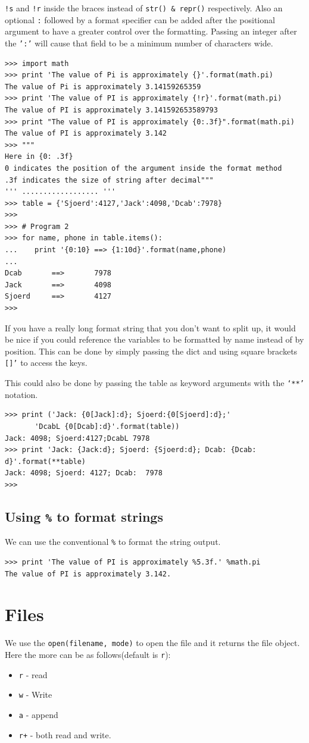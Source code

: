 \documentclass[12pt,a4paper]{article}
\begin{document}
\texttt{!s} and \texttt{!r} inside the braces instead of \texttt{str() \& repr()} respectively.  Also an optional \texttt{:} followed by a format specifier can be added after the positional argument to have a greater control over the formatting. Passing an integer after the \texttt{':'} will cause that field to be a minimum number of characters wide.

\begin{verbatim}
>>> import math
>>> print 'The value of Pi is approximately {}'.format(math.pi)
The value of Pi is approximately 3.14159265359
>>> print 'The value of PI is approximately {!r}'.format(math.pi)
The value of PI is approximately 3.141592653589793
>>> print "The value of PI is approximately {0:.3f}".format(math.pi)
The value of PI is approximately 3.142
>>> """
Here in {0: .3f}
0 indicates the position of the argument inside the format method
.3f indicates the size of string after decimal"""
''' .................. '''
>>> table = {'Sjoerd':4127,'Jack':4098,'Dcab':7978}
>>> 
>>> # Program 2
>>> for name, phone in table.items():
...    print '{0:10} ==> {1:10d}'.format(name,phone)
...
Dcab       ==>       7978
Jack       ==>       4098
Sjoerd     ==>       4127
>>> 
\end{verbatim}
If you have a really long format string that you don’t want to split up, it would be nice if you could reference the variables to be formatted by name instead of by position. This can be done by simply passing the dict and using square brackets \texttt{[]'} to access the keys. 

This could also be done by passing the table as keyword arguments with the \texttt{‘**’} notation.
\begin{verbatim}
>>> print ('Jack: {0[Jack]:d}; Sjoerd:{0[Sjoerd]:d};'
       'DcabL {0[Dcab]:d}'.format(table))
Jack: 4098; Sjoerd:4127;DcabL 7978
>>> print 'Jack: {Jack:d}; Sjoerd: {Sjoerd:d}; Dcab: {Dcab: d}'.format(**table)
Jack: 4098; Sjoerd: 4127; Dcab:  7978
>>> 
\end{verbatim}
\subsection{Using \texttt{\%} to format strings}
We can use the conventional \texttt{\%} to format the string output.
\begin{verbatim}
>>> print 'The value of PI is approximately %5.3f.' %math.pi
The value of PI is approximately 3.142.
\end{verbatim} 

\section{Files}
We use the \texttt{open(filename, mode)} to open the file and it returns the file object. Here the more can be as follows(default is \texttt{r}):
\begin{itemize}
\item \texttt{r} - read
\item \texttt{w} - Write
\item \texttt{a} - append
\item \texttt{r+} - both read and write.
\end{itemize}
\end{document}

